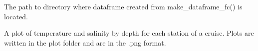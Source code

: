 \documentclass[a4paper]{book}
\begin{document}
%
\begin{Arguments}
\begin{ldescription}
\item[\code{current\_path}] The path to directory where dataframe created from
make\_dataframe\_fc() is located.
\end{ldescription}
\end{Arguments}
%
\begin{Value}
A plot of temperature and salinity by depth for each
station of a cruise. Plots are written in the plot folder and
are in the .png format.
\end{Value}
\printindex{}
\end{document}

